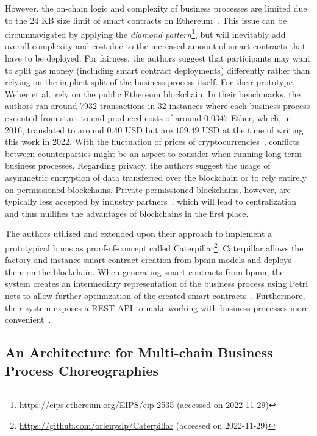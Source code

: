 However, the on-chain logic and complexity of business processes are limited due to the 24 KB size limit of smart contracts on Ethereum~\cite{ethereum_yellow_paper}. This issue can be circumnavigated by applying the \textit{diamond pattern}\footnote{\url{https://eips.ethereum.org/EIPS/eip-2535} (accessed on 2022-11-29)}, but will inevitably add overall complexity and cost due to the increased amount of smart contracts that have to be deployed. For fairness, the authors suggest that participants may want to split gas money (including smart contract deployments) differently rather than relying on the implicit split of the business process itself. For their prototype, Weber et al.\ rely on the public Ethereum blockchain. In their benchmarks, the authors ran around 7932 transactions in 32 instances where each business process executed from start to end produced costs of around $0.0347$ Ether, which, in 2016, translated to around $0.40$ USD but are $109.49$ USD at the time of writing this work in 2022. With the fluctuation of prices of cryptocurrencies~\cite{predicting_cryptocurrency_price_bubbles,monitoring_financial_stability_cryptocurrencies}, conflicts between counterparties might be an aspect to consider when running long-term business processes. Regarding privacy, the authors suggest the usage of asymmetric encryption of data transferred over the blockchain or to rely entirely on permissioned blockchains. Private permissioned blockchains, however, are typically less accepted by industry partners~\cite{public_chains_make_private_chains_obsolete}, which will lead to centralization and thus nullifies the advantages of blockchains in the first place.

The authors utilized and extended upon their approach to implement a prototypical \gls{bpms} as proof-of-concept called Caterpillar\footnote{\url{https://github.com/orlenyslp/Caterpillar} (accessed on 2022-11-29)}. Caterpillar allows the factory and instance smart contract creation from \gls{bpmn} models and deploys them on the blockchain. When generating smart contracts from \gls{bpmn}, the system creates an intermediary representation of the business process using Petri nets to allow further optimization of the created smart contracts~\cite{optimized_execution_of_bp_using_petri_nets_on_blockchain}. Furthermore, their system exposes a REST API to make working with business processes more convenient~\cite{caterpillar_blockchain_based_bpm_system,caterpillar_bp_execution_engine_on_eth}.


\subsection{An Architecture for Multi-chain Business Process Choreographies~\cite{architecture_for_multi_chain_bp_ladleif}}

